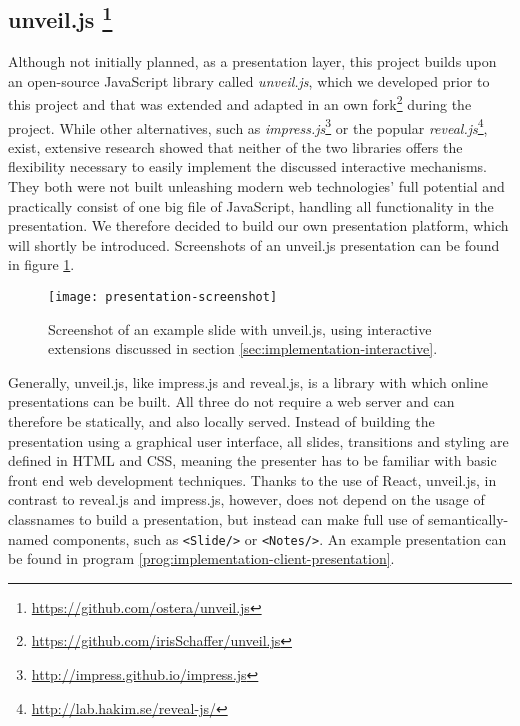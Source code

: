 \subsection[unveil.js]%
             {unveil.js%
             \protect\footnote{\url{https://github.com/ostera/unveil.js}}}    
\label{sec:implementation-technologies-unveil}
Although not initially planned, as a presentation layer, this project builds upon an open-source JavaScript library called \textit{unveil.js}, which we developed prior to this project and that was extended and adapted in an own fork\footnote{\url{https://github.com/irisSchaffer/unveil.js}} during the project. While other alternatives, such as \emph{impress.js}\footnote{\url{http://impress.github.io/impress.js}} or the popular \emph{reveal.js}\footnote{\url{http://lab.hakim.se/reveal-js/}}, exist, extensive research showed that neither of the two libraries offers the flexibility necessary to easily implement the discussed interactive mechanisms. They both were not built unleashing modern web technologies' full potential and practically consist of one big file of JavaScript, handling all functionality in the presentation. We therefore decided to build our own presentation platform, which will shortly be introduced. Screenshots of an unveil.js presentation can be found in figure \ref{fig:implementation-technologies-unveil-screenshots}.
%
\begin{figure}
\centering
\texttt{[image: presentation-screenshot]}
\caption{Screenshot of an example slide with unveil.js, using interactive extensions discussed in section \ref{sec:implementation-interactive}.}
\label{fig:implementation-technologies-unveil-screenshots}
\end{figure}
%
Generally, unveil.js, like impress.js and reveal.js, is a library with which online presentations can be built. All three do not require a web server and can therefore be statically, and also locally served. Instead of building the presentation using a graphical user interface, all slides, transitions and styling are defined in HTML and CSS, meaning the presenter has to be familiar with basic front end web development techniques. Thanks to the use of React, unveil.js, in contrast to reveal.js and impress.js, however, does not depend on the usage of classnames to build a presentation, but instead can make full use of semantically-named components, such as \texttt{<Slide/>} or \texttt{<Notes/>}. An example presentation can be found in program \ref{prog:implementation-client-presentation}.

